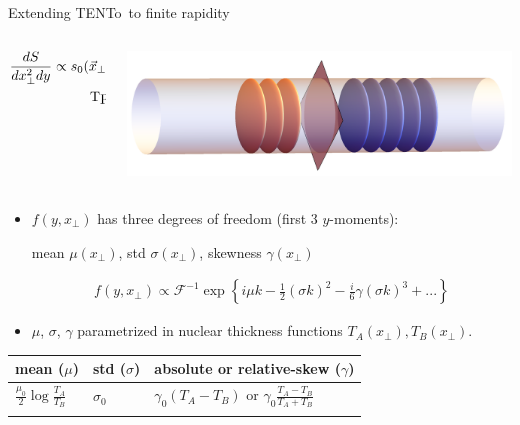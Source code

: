 \documentclass[11pt]{beamer}
\newcommand{\TRENTo}{T\raisebox{-0.2em}{R}ENTo~}
\begin{document}
\begin{frame}{Extending \TRENTo to finite rapidity}
\begin{columns}
\begin{column}{0.7\textwidth}
\begin{eqnarray}
\nonumber 
\frac{dS}{dx_\perp^2d y} \propto
s_0(\vec{x}_\perp, y=0)  &\times&	{\color{orange}f(y, x_\perp)}.\\
\nonumber 
\textrm{ \TRENTo} &\times& \textrm{{\color{orange} rapidity profile}}
\end{eqnarray} 
\end{column}
\begin{column}{0.3\textwidth}
\includegraphics[width=\textwidth]{traincar-crop.pdf}
\end{column}
\end{columns}

\begin{itemize}
\item {\color{orange} $f(y, x_\perp)$} has three degrees of freedom (first 3 $y$-moments):\\
\begin{center}
mean $\mu(x_\perp)$, std $\sigma(x_\perp)$, skewness $\gamma(x_\perp)$
\end{center}
\vspace*{-0.2cm}
\begin{eqnarray}\nonumber 
f(y, x_\perp) \propto \mathcal{F}^{-1}\exp\left\{i\mu k -\frac{1}{2}(\sigma k)^2 - \frac{i}{6}\gamma(\sigma k)^3 + ...\right\}
\end{eqnarray}
\item $\mu$, $\sigma$, $\gamma$ parametrized in nuclear thickness functions $T_A(x_\perp), T_B(x_\perp)$.
\end{itemize}
\begin{center}
\begin{tabularx}{0.8\textwidth}{p{2.3cm}p{1.2cm}p{6cm}}
\hline
mean ($\mu$) & std ($\sigma$) &$\left.\right.${\color{red!70}absolute} or {\color{blue!70}relative}-skew ($\gamma$) \\
\hline
\noalign{\smallskip}
$\frac{\mu_0}{2} \log\frac{T_A}{T_B}$ & $\sigma_0$ & $\left.\right.${\color{red!70}$\gamma_0(T_A-T_B)$} 
or 
{\color{blue!70}$\gamma_0\frac{T_A-T_B}{T_A+T_B}$} \\
\noalign{\smallskip}
\hline
\end{tabularx}
\end{center}
\end{frame}
\end{document}

